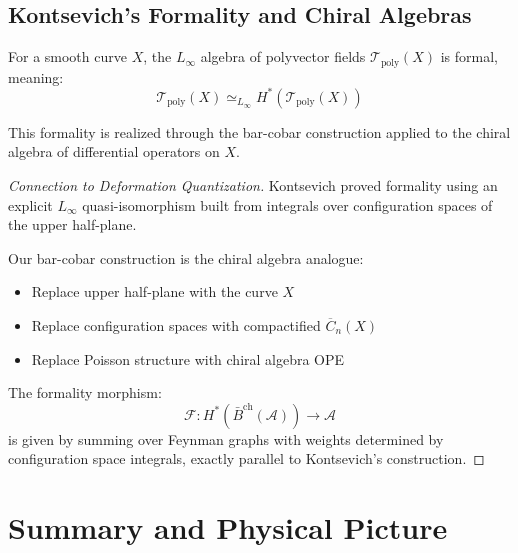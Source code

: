 \subsection{Kontsevich's Formality and Chiral Algebras}

\begin{theorem}
For a smooth curve $X$, the $L_\infty$ algebra of polyvector fields 
$\mathcal{T}_{\text{poly}}(X)$ is formal, meaning:
$$\mathcal{T}_{\text{poly}}(X) \simeq_{L_\infty} H^*(\mathcal{T}_{\text{poly}}(X))$$

This formality is realized through the bar-cobar construction applied to the 
chiral algebra of differential operators on $X$.
\end{theorem}

\begin{proof}[Connection to Deformation Quantization]
Kontsevich proved formality using an explicit $L_\infty$ quasi-isomorphism built 
from integrals over configuration spaces of the upper half-plane.

Our bar-cobar construction is the chiral algebra analogue:
\begin{itemize}
\item Replace upper half-plane with the curve $X$
\item Replace configuration spaces with compactified $\overline{C}_n(X)$
\item Replace Poisson structure with chiral algebra OPE
\end{itemize}

The formality morphism:
$$\mathcal{F}: H^*(\bar{B}^{\text{ch}}(\mathcal{A})) \to \mathcal{A}$$
is given by summing over Feynman graphs with weights determined by configuration 
space integrals, exactly parallel to Kontsevich's construction.
\end{proof}

\section{Summary and Physical Picture}

